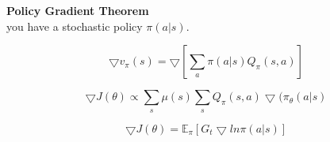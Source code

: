 \documentclass[../main.tex]{subfiles}
\begin{document}
    
    \textbf{Policy Gradient Theorem}\\
    you have a stochastic policy $\pi(a |s)$.
    
    $$ \bigtriangledown v_\pi(s) = \bigtriangledown \left[ \sum_a \pi(a|s)Q_\pi(s,a) \right] $$
    
    $$ \bigtriangledown J(\theta)  \propto  \sum_s\mu(s) \sum_s Q_\pi(s,a) \bigtriangledown  (\pi_\theta(a|s) $$
    
    $$ \bigtriangledown J(\theta)  =  \mathbb{E}_\pi \left[ G_t \bigtriangledown ln \pi(a|s) \right]$$
    
\end{document}
